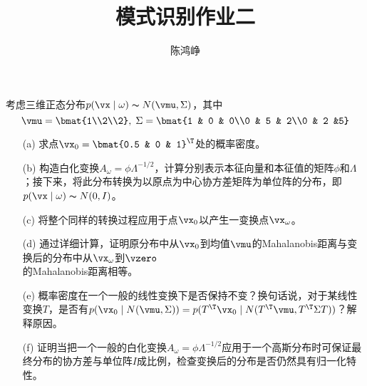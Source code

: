 \documentclass[reportComp]{thesis}
\title{模式识别作业二}
\subtitle{}
\author{陈鸿峥}
\begin{document}
\maketitle

\begin{question}[\textsection 2 Q23]
考虑三维正态分布$p(\vx\mid\omega)\thicksim N(\vmu,\Sigma)$，其中
\[\vmu=\bmat{1\\2\\2},\;\Sigma=\bmat{1 & 0 & 0\\0 & 5 & 2\\0 & 2 &5}\]
\begin{itemize}
	\item [(a)] 求点$\vx_0=\bmat{0.5 & 0 & 1}^\T$处的概率密度。
	\item [(b)] 构造白化变换$A_\omega=\phi\Lambda^{-1/2}$，计算分别表示本征向量和本征值的矩阵$\phi$和$\Lambda$；接下来，将此分布转换为以原点为中心协方差矩阵为单位阵的分布，即$p(\vx\mid\omega)\thicksim N(0,I)$。
	\item [(c)] 将整个同样的转换过程应用于点$\vx_0$以产生一变换点$\vx_\omega$。
	\item [(d)] 通过详细计算，证明原分布中从$\vx_0$到均值$\vmu$的Mahalanobis距离与变换后的分布中从$\vx_\omega$到$\vzero$\\的Mahalanobis距离相等。
	\item [(e)] 概率密度在一个一般的线性变换下是否保持不变？换句话说，对于某线性变换$T$，是否有$p(\vx_0\mid N(\vmu,\Sigma))=p(T^\T\vx_0\mid N(T^\T\vmu,T^\T\Sigma T))$？解释原因。
	\item [(f)] 证明当把一个一般的白化变换$A_\omega=\phi\Lambda^{-1/2}$应用于一个高斯分布时可保证最终分布的协方差与单位阵$I$成比例，检查变换后的分布是否仍然具有归一化特性。
\end{itemize}
\end{question}
\end{document}
